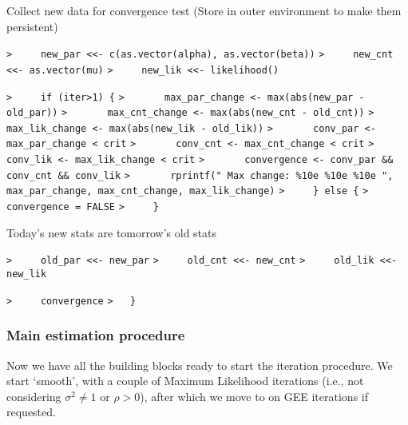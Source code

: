 \documentclass[a4paper]{article}
\begin{document}
Collect new data for convergence test
(Store in outer environment to make them persistent)\par
\verb~>     new_par <<- c(as.vector(alpha), as.vector(beta))~\newline
\verb~>     new_cnt <<- as.vector(mu)~\newline
\verb~>     new_lik <<- likelihood()~\par

\verb~>     if (iter>1) {~\newline
\verb~>       max_par_change <- max(abs(new_par - old_par))~\newline
\verb~>       max_cnt_change <- max(abs(new_cnt - old_cnt))~\newline
\verb~>       max_lik_change <- max(abs(new_lik - old_lik))~\newline
\verb~>       conv_par <- max_par_change < crit~\newline
\verb~>       conv_cnt <- max_cnt_change < crit~\newline
\verb~>       conv_lik <- max_lik_change < crit~\newline
\verb~>       convergence <- conv_par && conv_cnt && conv_lik~\newline
\verb~>       rprintf(" Max change: %10e %10e %10e ", max_par_change, max_cnt_change, max_lik_change)~\newline
\verb~>     } else {~\newline
\verb~>       convergence = FALSE~\newline
\verb~>     }~\par

Today's new stats are tomorrow's old stats\par
\verb~>     old_par <<- new_par~\newline
\verb~>     old_cnt <<- new_cnt~\newline
\verb~>     old_lik <<- new_lik~\par

\verb~>     convergence~\newline
\verb~>   }~\par



\subsubsection{Main estimation procedure}\par

Now we have all the building blocks ready to start the iteration procedure.
We start `smooth', with a couple of Maximum Likelihood iterations
(i.e., not considering $\sigma^2\neq1$ or $\rho>0$), after which we move to on
GEE iterations if requested.\par
\end{document}
